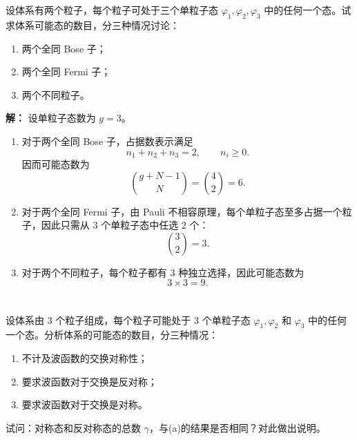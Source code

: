 \documentclass[12pt,a4paper]{article}
\begin{document}
\section{}

设体系有两个粒子，每个粒子可处于三个单粒子态 $\varphi_1,\varphi_2,\varphi_3$ 中的任何一个态。试求体系可能态的数目，分三种情况讨论：
\begin{enumerate}[label=(\alph*)]
    \item 两个全同 Bose 子；
    \item 两个全同 Fermi 子；
    \item 两个不同粒子。
\end{enumerate}

\vspace{0.5cm}
\noindent\textbf{解：}
设单粒子态数为 $g=3$。
\begin{enumerate}[label=(\alph*)]
    \item 对于两个全同 Bose 子，占据数表示满足
    \[
    n_1+n_2+n_3=2,\qquad n_i\ge 0.
    \]
    因而可能态数为
    \[
    \binom{g+N-1}{N}=\binom{4}{2}=6.
    \]

    \item 对于两个全同 Fermi 子，由 Pauli 不相容原理，每个单粒子态至多占据一个粒子，因此只需从 $3$ 个单粒子态中任选 $2$ 个：
    \[
    \binom{3}{2}=3.
    \]

    \item 对于两个不同粒子，每个粒子都有 $3$ 种独立选择，因此可能态数为
    \[
    3\times 3=9.
    \]
\end{enumerate}

\section{}

设体系由 $3$ 个粒子组成，每个粒子可能处于 $3$ 个单粒子态 $\varphi_1,\varphi_2$ 和 $\varphi_3$ 中的任何一个态。分析体系的可能态的数目，分三种情况：
\begin{enumerate}[label=(\alph*)]
    \item 不计及波函数的交换对称性；
    \item 要求波函数对于交换是反对称；
    \item 要求波函数对于交换是对称。
\end{enumerate}
试问：对称态和反对称态的总数 $\gamma$，与(a)的结果是否相同？对此做出说明。
\end{document}

